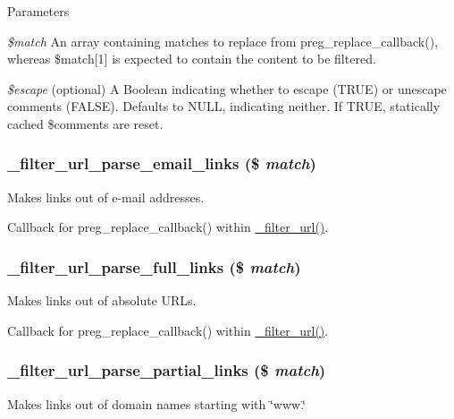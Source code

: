 \begin{DoxyParams}{Parameters}
\item[{\em \$match}]An array containing matches to replace from preg\_\-replace\_\-callback(), whereas \$match\mbox{[}1\mbox{]} is expected to contain the content to be filtered. \item[{\em \$escape}](optional) A Boolean indicating whether to escape (TRUE) or unescape comments (FALSE). Defaults to NULL, indicating neither. If TRUE, statically cached \$comments are reset. \end{DoxyParams}
\hypertarget{group__standard__filters_gae2d1ce14d2a727aba3aa5637513ec7d0}{
\subsubsection[{\_\-filter\_\-url\_\-parse\_\-email\_\-links}]{\setlength{\rightskip}{0pt plus 5cm}\_\-filter\_\-url\_\-parse\_\-email\_\-links (\$ {\em match})}}
\label{group__standard__filters_gae2d1ce14d2a727aba3aa5637513ec7d0}
Makes links out of e-\/mail addresses.

Callback for preg\_\-replace\_\-callback() within \hyperlink{group__standard__filters_ga3014977a8aa365044b11f94abf04f313}{\_\-filter\_\-url()}. \hypertarget{group__standard__filters_ga68b2f3e518a53457b06137c5a7525f3c}{
\subsubsection[{\_\-filter\_\-url\_\-parse\_\-full\_\-links}]{\setlength{\rightskip}{0pt plus 5cm}\_\-filter\_\-url\_\-parse\_\-full\_\-links (\$ {\em match})}}
\label{group__standard__filters_ga68b2f3e518a53457b06137c5a7525f3c}
Makes links out of absolute URLs.

Callback for preg\_\-replace\_\-callback() within \hyperlink{group__standard__filters_ga3014977a8aa365044b11f94abf04f313}{\_\-filter\_\-url()}. \hypertarget{group__standard__filters_ga37765388ac6d3986ed00dcbfc41d330f}{
\subsubsection[{\_\-filter\_\-url\_\-parse\_\-partial\_\-links}]{\setlength{\rightskip}{0pt plus 5cm}\_\-filter\_\-url\_\-parse\_\-partial\_\-links (\$ {\em match})}}
\label{group__standard__filters_ga37765388ac6d3986ed00dcbfc41d330f}
Makes links out of domain names starting with \char`\"{}www.\char`\"{}

